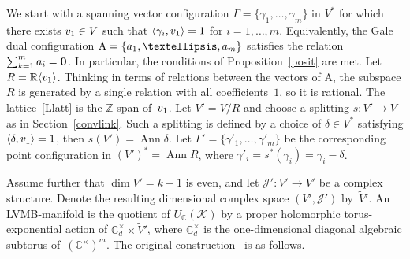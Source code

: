 \documentclass[a4paper]{amsart}
\theoremstyle{definition}
\theoremstyle{remark}
\numberwithin{equation}{section}
\def\R{\mathbb R}
\def\C{\mathbb C}
\def\R{\mathbb R}
\def\Z{\mathbb Z}
\def\sK{\mathcal K}
\newcommand{\mb}[1]{{\textbf {\textit#1}}}
\def\Ann{\mathop{\mathrm{Ann}}}
\newcommand{\<}{\langle}
\renewcommand{\>}{\rangle}
\begin{document}
We start with a spanning vector configuration $\Gamma=\{\gamma_1,\ldots,\gamma_m\}$ in $V^*$ for which there exists $\mb v_1\in V$ such that $\langle\gamma_i,\mb v_1\rangle=1$ for $i=1,\ldots,m$. Equivalently, the Gale dual configuration $\mathrm A=\{\mb a_1,\ldots,\mb a_m\}$ satisfies the relation 
$\sum_{k=1}^m\mb a_i=\bf0$. In particular, the conditions of Proposition~\ref{posit} are met. Let $R=\R\langle\mb v_1\rangle$.
Thinking in terms of relations between the vectors of $\mathrm A$, the subspace $R$ is generated by a single relation with all coefficients~$1$, so it is rational. The lattice~\eqref{Llatt} is the 
$\Z$-span of~$\mb v_1$. Let $V'=V/R$ and choose a splitting $s\colon V'\to V$ as in Section~\ref{convlink}. Such a splitting is defined by a choice of $\delta\in V^*$ satisfying $\langle\delta,\mb v_1\rangle=1$, then $s(V')=\Ann\delta$. Let
$\Gamma'=\{\gamma'_1,\ldots,\gamma'_m\}$ be the corresponding point configuration in $(V')^*=\Ann R$, where $\gamma'_i=s^*(\gamma_i)=\gamma_i-\delta$.

Assume further that $\dim V'=k-1$ is even, and let $\mathcal J'\colon V'\to V'$ be a complex structure. Denote the resulting dimensional complex space $(V',\mathcal J')$ by~$\widetilde V'$. An LVMB-manifold is the quotient of $U_\C(\sK)$ by a proper holomorphic torus-exponential action of $\C^\times_d\times\widetilde V'$, where 
$\C^\times_d$ is the one-dimensional diagonal algebraic subtorus 
of~$(\C^\times)^m$. The original construction~\cite{bosi01} is as follows.
\end{document}
